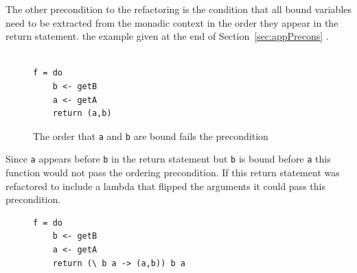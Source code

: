 The other precondition to the \DIFdelbegin {}\DIFdelend \DIFaddbegin {}\DIFaddend refactoring is the condition that all bound variables need to be extracted from the monadic context in the order they appear in the return statement. \DIFdelbegin {}\DIFdelend \DIFaddbegin {}\DIFaddend the example given at the end of Section~\ref{sec:appPrecons} \DIFdelbegin {}\DIFdelend \DIFaddbegin {}\DIFaddend .

\begin{figure}[t]
\DIFdelbeginFL %

\DIFdelendFL \DIFaddbeginFL \begin{lstlisting}

f = do
	b <- getB
	a <- getA
	return (a,b)
\end{lstlisting} 
\DIFaddendFL \caption{The order that \texttt{a} and \texttt{b} are bound fails the precondition}
\label{ordering}
\end{figure}


Since \texttt{a} appears before \texttt{b} in the return statement but \texttt{b} is bound before \texttt{a} this function would not pass the ordering precondition. If this return statement was refactored to include a lambda that flipped the arguments it could pass this precondition. \DIFaddbegin {}\DIFaddend 

\DIFaddbegin \begin{figure}[t]
\DIFaddendFL \begin{lstlisting}
f = do
	b <- getB
	a <- getA
	return (\ b a -> (a,b)) b a
\end{lstlisting}
\DIFaddbeginFL \caption{\texttt{} }
\label{reordered}
\end{figure}
\DIFaddend 

\DIFdelbegin {}%

